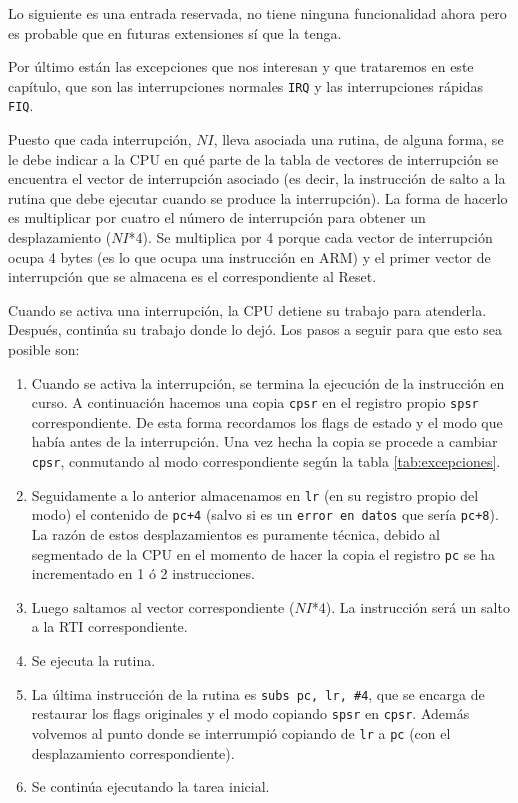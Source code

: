 Lo siguiente es una entrada reservada, no tiene ninguna funcionalidad ahora
pero es probable que en futuras extensiones sí que la tenga.

Por último están las excepciones que nos interesan y que trataremos en este capítulo, que son
las interrupciones normales {\tt IRQ} y las interrupciones rápidas {\tt FIQ}.

Puesto que cada interrupción, $NI$, lleva asociada una rutina, de
alguna forma, se le debe indicar a la CPU en qué parte de la tabla de
vectores de interrupción se encuentra el vector de interrupción
asociado (es decir, la instrucción de salto a la rutina que debe
ejecutar cuando se produce la interrupción). La forma de hacerlo es multiplicar por
cuatro el número de interrupción para obtener un desplazamiento
($NI$*4). Se multiplica por 4 porque cada vector de interrupción
ocupa 4 bytes (es lo que ocupa una instrucción en ARM) y el primer
vector de interrupción que se almacena es el correspondiente al Reset.

Cuando se activa una interrupción, la CPU detiene su trabajo para
atenderla. Después, continúa su trabajo donde lo dejó. Los pasos a
seguir para que esto sea posible son:

\begin{enumerate}
  \item Cuando se activa la interrupción, se termina la ejecución de la
    instrucción en curso. A continuación hacemos una copia {\tt cpsr} en el registro
    propio {\tt spsr} correspondiente. De esta forma recordamos los flags de estado
    y el modo que había antes de la interrupción. Una vez hecha la copia se
    procede a cambiar {\tt cpsr}, conmutando al modo correspondiente
    según la tabla \ref{tab:excepciones}.

  \item Seguidamente a lo anterior almacenamos en {\tt lr} (en su registro propio del modo)
    el contenido de {\tt pc+4} (salvo si es un {\tt error en datos} que sería
    {\tt pc+8}). La razón de estos
    desplazamientos es puramente técnica, debido al segmentado de la CPU en
    el momento de hacer la copia el registro {\tt pc} se ha incrementado en 1 ó
    2 instrucciones.

  \item Luego saltamos al vector correspondiente ($NI$*4). La instrucción será un salto
    a la RTI correspondiente.

  \item Se ejecuta la rutina.

  \item La última instrucción de la rutina es {\tt subs pc, lr, \#4}, que se encarga
    de restaurar los flags originales y el modo copiando {\tt spsr} en {\tt cpsr}.
    Además volvemos al punto donde se interrumpió copiando de {\tt lr} a {\tt pc} (con el
    desplazamiento correspondiente).

   \item Se continúa ejecutando la tarea inicial.
\end{enumerate}

